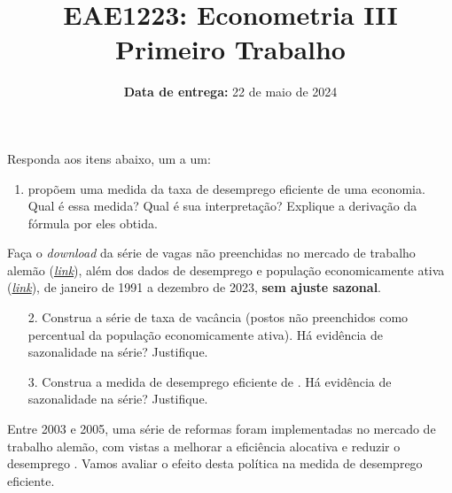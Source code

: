 \documentclass[12pt,a4paper]{article}
\title{ \large EAE1223: Econometria III \\
	{\large Primeiro Trabalho}}
\date{\small \textbf{Data de entrega:} 22 de maio de 2024}
\begin{document}
	\maketitle
	Responda aos itens abaixo, um a um:
\begin{enumerate}
	\item \citet{michaillat2022u} propõem uma medida da taxa de desemprego eficiente de uma economia. Qual é essa medida? Qual é sua interpretação? Explique a derivação da fórmula por eles obtida.
\end{enumerate}
	Faça o \textit{download} da série de vagas não preenchidas no mercado de trabalho alemão (\href{https://data-explorer.oecd.org/vis?tm=unfilled\%20vacancies\%20germany&pg=0&hc[Reference\%20area]=Germany&hc[Measure]=Unfilled\%20vacancies&snb=1&df[ds]=dsDisseminateFinalDMZ&df[id]=DSD_OLAB\%40DF_OIALAB_INDIC&df[ag]=OECD.SDD.TPS&df[vs]=1.1&pd=\%2C&dq=DEU.VAC_U.._Z.Y..M&ly[cl]=TIME_PERIOD&to[TIME_PERIOD]=false&lo=13&lom=LASTNPERIODS}{\textit{link}}), além dos dados de desemprego e população economicamente ativa (\href{https://www-genesis.destatis.de/genesis//online?operation=table&language=en&code=13231-0001&bypass=true&levelindex=0&levelid=1713437546333#abreadcrumb}{\textit{link}}), de janeiro de 1991 a dezembro de 2023, \textbf{sem ajuste sazonal}.
	\begin{enumerate}
	\item[2.] Construa a série de taxa de vacância (postos não preenchidos como percentual da população economicamente ativa). Há evidência de sazonalidade na série? Justifique.
	
	\item[3.] Construa a medida de desemprego eficiente de \citet{michaillat2022u}. Há evidência de sazonalidade na série? Justifique.
\end{enumerate}
	Entre 2003 e 2005, uma série de reformas foram implementadas no mercado de trabalho alemão, com vistas a melhorar a eficiência alocativa e reduzir o desemprego \citep{Bradley2019}. Vamos avaliar o efeito desta política na medida de desemprego eficiente.
\end{document}
